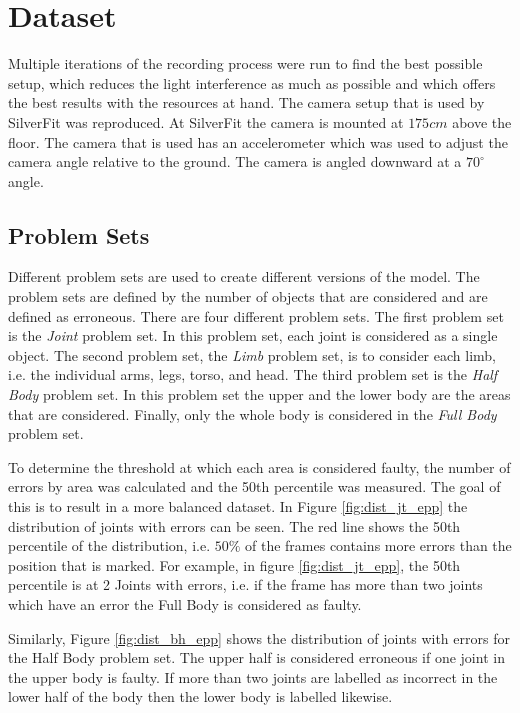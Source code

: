 \section{Dataset}

Multiple iterations of the recording process were run to find the best possible setup, which reduces the light interference as much as possible and which offers the best results with the resources at hand. The camera setup that is used by SilverFit was reproduced. At SilverFit the camera is mounted at $175cm$ above the floor. The camera that is used has an accelerometer which was used to adjust the camera angle relative to the ground. The camera is angled downward at a $70^\circ$ angle. 

\subsection{Problem Sets}
\label{sec:problem_set}

Different problem sets are used to create different versions of the model. The problem sets are defined by the number of objects that are considered and are defined as erroneous. There are four different problem sets. The first problem set is the \textit{Joint} problem set. In this problem set, each joint is considered as a single object. The second problem set,  the \textit{Limb} problem set, is to consider each limb, i.e. the individual arms, legs, torso, and head. The third problem set is the \textit{Half Body} problem set. In this problem set the upper and the lower body are the areas that are considered. Finally, only the whole body is considered in the \textit{Full Body} problem set.

To determine the threshold at which each area is considered faulty, the number of errors by area was calculated and the 50th percentile was measured. The goal of this is to result in a more balanced dataset. In Figure \ref{fig:dist_jt_epp} the distribution of joints with errors can be seen. The red line shows the 50th percentile of the distribution, i.e. $50\%$ of the frames contains more errors than the position that is marked. For example, in figure \ref{fig:dist_jt_epp}, the 50th percentile is at 2 Joints with errors, i.e. if the frame has more than two joints which have an error the Full Body is considered as faulty.

Similarly, Figure \ref{fig:dist_bh_epp} shows the distribution of joints with errors for the Half Body problem set. The upper half is considered erroneous if one joint in the upper body is faulty. If more than two joints are labelled as incorrect in the lower half of the body then the lower body is labelled likewise.

